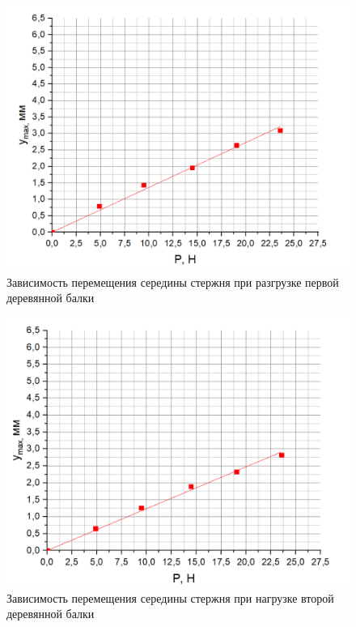 \documentclass[a4paper,12pt]{article} %
\begin{document}
\begin{figure}[h]
\centering
\includegraphics[scale=0.32]{9}
\caption{Зависимость перемещения середины стержня при разгрузке первой деревянной балки}
\end{figure}
\begin{figure}[!h]
\centering
\includegraphics[scale=0.32]{10}
\caption{Зависимость перемещения середины стержня при нагрузке второй деревянной балки}
\end{figure}
\newpage
\end{document}
